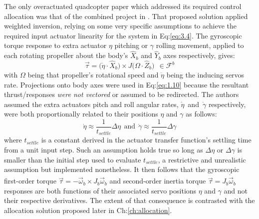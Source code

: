 The only overactuated quadcopter paper which addressed its required control allocation was that of the combined project in \cite{tiltgasco,tiltrihani}. That proposed solution applied weighted inversion, relying on some very specific assumptions to achieve the required input actuator linearity for the system in Eq:\ref{eq:3.4}. The gyroscopic torque response to extra actuator $\eta$ pitching or $\gamma$ rolling movement, applied to each rotating propeller about the body's $\hat{X}_b$ and $\hat{Y}_b$ axes respectively, gives:
\begin{equation}\label{eq:1.10}
\vec{\tau}=\big(\dot{\eta}\cdot\hat{X}_b\big)\times J\big(\Omega\cdot\hat{Z}_b\big)~~\in\mathcal{F}^b
\end{equation}
with $\Omega$ being that propeller's rotational speed and $\dot{\eta}$ being the inducing servos rate. Projections onto body axes were used in Eq:\ref{eq:1.10} because the resultant thrust/responses \emph{were not vectored} or assumed to be redirected. The authors assumed the extra actuators pitch and roll angular rates, $\dot{\eta}$~and~$\dot{\gamma}$ respectively, were both proportionally related to their positions $\eta$ and $\gamma$ as follows:
\begin{equation}
\dot{\eta}\approx \frac{1}{t_{settle}}\Delta\eta~~\text{and}~~\dot{\gamma}\approx \frac{1}{t_{settle}}\Delta\gamma
\end{equation}
where $t_{settle}$ is a constant derived in the actuator transfer function's settling time from a unit input step. Such an assumption holds true so long as $\Delta\eta$ or $\Delta\gamma$ is smaller than the initial step used to evaluate $t_{settle}$, a restrictive and unrealistic assumption but implemented nonetheless. It then follows that the gyroscopic first-order torque $\vec{\tau}=-\vec{\omega}_b\times J_b\vec{\omega}_b$ and second-order inertia torque $\vec{\tau}=J_b\dot{\vec{\omega}}_b$ responses are both functions of their associated servo positions $\eta$ and $\gamma$ and not their respective derivatives. The extent of that consequence is contrasted with the allocation solution proposed later in Ch:\ref{ch:allocation}.
